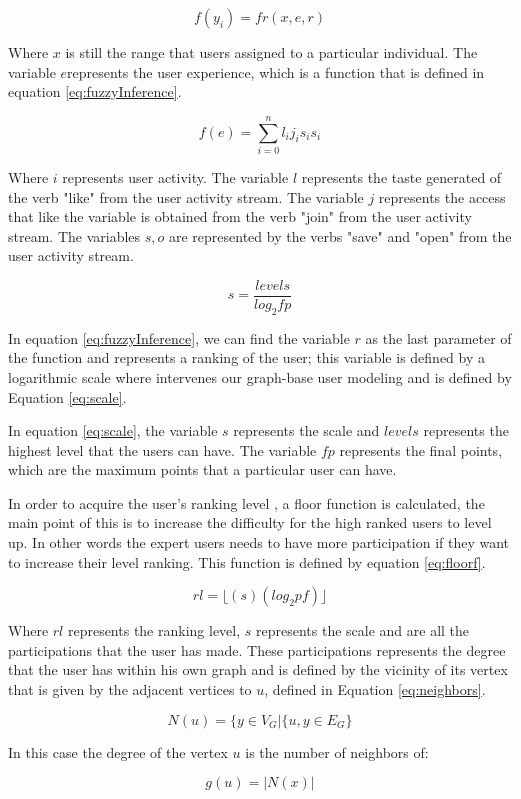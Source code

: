 \begin{equation}\label{eq:fuzzyInference}
\displaystyle f(y_i)= fr(x, e, r)
\end{equation}

Where $x$ is still the range that users assigned to a particular individual. The variable $e$represents the user experience, which is a function that is defined in equation \ref{eq:fuzzyInference}.

\begin{equation}\label{eq:userEperience}
\displaystyle f(e) = \sum_{i=0}^{n}l_{i}j_{i}s_{i}s_{i}
\end{equation}

Where $i$ represents user activity. The variable $l$ represents the taste generated of the verb "like" from the user activity stream.
The variable  $j$ represents the access that like the variable  is obtained from the verb "join" from the user activity stream. The variables $s, o$ are represented by the verbs "save" and "open" from the user activity stream.

\begin{equation}\label{eq:scale}
\displaystyle s =\frac{levels}{log_{2}fp}
\end{equation}

In equation \ref{eq:fuzzyInference}, we can find the variable $r$ as the last parameter of the function and represents a ranking of the user; this variable is defined by a logarithmic scale where intervenes our graph-base user modeling  and is defined by Equation \ref{eq:scale}.

In equation \ref{eq:scale}, the variable $s$ represents the scale and $levels$ represents the highest level that the users can have. The variable $fp$ represents the final points, which are the maximum points that a particular user can have.

In order to acquire the user's ranking level , a floor function  is calculated, the main point of this is to increase the difficulty for the high ranked users to level up. In other words the expert users needs to have more participation if they want to increase their level ranking. This function is defined by equation \ref{eq:floorf}.

\begin{equation}\label{eq:floorf}
\displaystyle rl=\lfloor(s)(log_2pf)\rfloor
\end{equation}

Where $rl$ represents the ranking level, $s$ represents the scale and  are all the participations  that the user has made. These participations represents the degree that the user has within his own graph and is defined by the vicinity of its vertex  that is given by the adjacent vertices to $u$, defined in Equation \ref{eq:neighbors}.

\begin{equation}\label{eq:neighbors}
\displaystyle N(u)={\{y\in V_{G}|\{u,y}\in E_{G}\}
\end{equation}

In this case the degree of the vertex $u$ is the number of neighbors of: 

\begin{equation}\label{eq:degree}
\displaystyle g(u)=|N(x)|
\end{equation}











